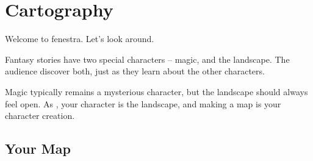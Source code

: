 \chapter[The Cartographers]{Cartography}
\label{civilization}

Welcome to \gls{fenestra}.
Let's look around.

Fantasy stories have two special characters -- magic, and the landscape.
The audience discover both, just as they learn about the other characters.

Magic typically remains a mysterious character, but the landscape should always feel open.
As , your character is the landscape, and making a map is your character creation.

\section{Your Map}
\label{yourMap}

